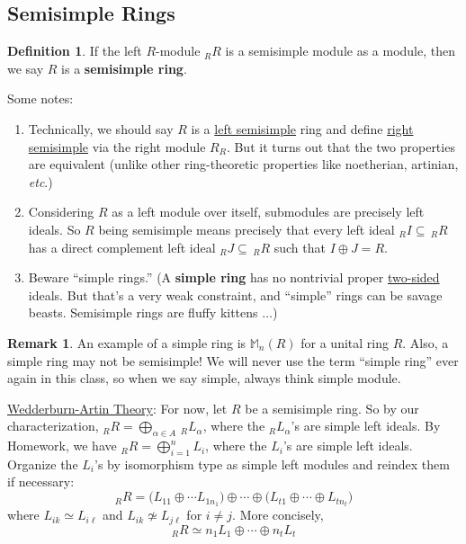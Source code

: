 \documentclass[12pt]{article}
\newcommand{\ita}[1]{\textit{#1}}
\theoremstyle{definition}
\newtheorem{definition}[theorem]{Definition}
\newtheorem*{remark}{Remark}
\newcommand{\m}{\mathbb{M}}
\begin{document}
\subsection{Semisimple Rings}
\begin{definition}
    If the left $R$-module $_RR$ is a semisimple module as a module, then we say $R$ is a \textbf{semisimple ring}.
\end{definition}
Some notes:
\begin{enumerate}
    \item Technically, we should say $R$ is a \underline{left semisimple} ring and define \underline{right semisimple} via the right module $R_R$. But it turns out that the two properties are equivalent (unlike other ring-theoretic properties like noetherian, artinian, \ita{etc}.)
    \item Considering $R$ as a left module over itself, submodules are precisely left ideals. So $R$ being semisimple means precisely that every left ideal $_RI\subseteq\,_RR$ has a direct complement left ideal $_RJ\subseteq\,_RR$ such that $I\oplus J=R$.
    \item Beware ``simple rings.'' (A \textbf{simple ring} has no nontrivial proper \underline{two-sided} ideals. But that's a very weak constraint, and ``simple'' rings can be savage beasts. Semisimple rings are fluffy kittens $\dotsc$)
\end{enumerate}
\begin{remark}
    An example of a simple ring is $\m_n(R)$ for a unital ring $R$. Also, a simple ring may not be semisimple! We will never use the term ``simple ring'' ever again in this class, so when we say simple, always think simple module.
\end{remark}
\underline{Wedderburn-Artin Theory}: For now, let $R$ be a semisimple ring. So by our characterization, $_RR=\bigoplus\limits_{\alpha\in A}\,_RL_{\alpha}$, where the $_RL_{\alpha}$'s are simple left ideals. By Homework, we have $_RR=\bigoplus\limits_{i=1}^nL_i$, where the $L_i$'s are simple left ideals. Organize the $L_i$'s by isomorphism type as simple left modules and reindex them if necessary:
\begin{equation}
    _RR=\Big(L_{11}\oplus\dotsb L_{1n_1}\Big)\oplus\dotsb\oplus\Big(L_{t1}\oplus\dotsb\oplus L_{tn_{t}}\Big)
\end{equation}
where $L_{ik}\simeq L_{i\ell}$ and $L_{ik}\not\simeq L_{j\ell}$ for $i\neq j$. More concisely,
\begin{equation}
    _RR\simeq n_1L_1\oplus\dotsb\oplus n_tL_t
\end{equation}
\end{document}

